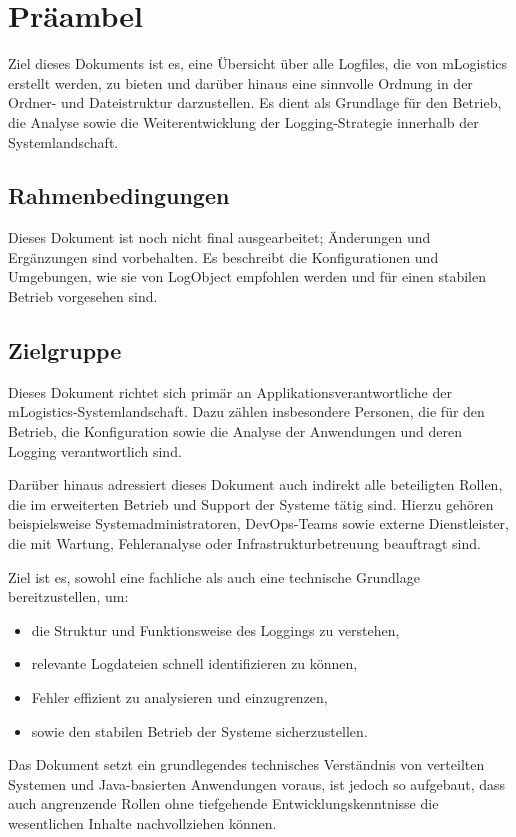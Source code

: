 \chapter{Präambel}Ziel dieses Dokuments ist es, eine Übersicht über alle Logfiles, die von mLogistics erstellt werden, zu bieten und darüber hinaus eine sinnvolle Ordnung in der Ordner- und Dateistruktur darzustellen. Es dient als Grundlage für den Betrieb, die Analyse sowie die Weiterentwicklung der Logging-Strategie innerhalb der Systemlandschaft.

\section{Rahmenbedingungen}
Dieses Dokument ist noch nicht final ausgearbeitet; Änderungen und Ergänzungen sind vorbehalten.
Es beschreibt die Konfigurationen und Umgebungen, wie sie von LogObject empfohlen werden und für einen stabilen Betrieb vorgesehen sind.

\section{Zielgruppe}

Dieses Dokument richtet sich primär an Applikationsverantwortliche der mLogistics-Systemlandschaft. Dazu zählen insbesondere Personen, die für den Betrieb, die Konfiguration sowie die Analyse der Anwendungen und deren Logging verantwortlich sind.

Darüber hinaus adressiert dieses Dokument auch indirekt alle beteiligten Rollen, die im erweiterten Betrieb und Support der Systeme tätig sind. Hierzu gehören beispielsweise Systemadministratoren, DevOps-Teams sowie externe Dienstleister, die mit Wartung, Fehleranalyse oder Infrastrukturbetreuung beauftragt sind.

Ziel ist es, sowohl eine fachliche als auch eine technische Grundlage bereitzustellen, um:
\begin{itemize}
\item die Struktur und Funktionsweise des Loggings zu verstehen,
\item relevante Logdateien schnell identifizieren zu können,
\item Fehler effizient zu analysieren und einzugrenzen,
\item sowie den stabilen Betrieb der Systeme sicherzustellen.
\end{itemize}

Das Dokument setzt ein grundlegendes technisches Verständnis von verteilten Systemen und Java-basierten Anwendungen voraus, ist jedoch so aufgebaut, dass auch angrenzende Rollen ohne tiefgehende Entwicklungskenntnisse die wesentlichen Inhalte nachvollziehen können.
